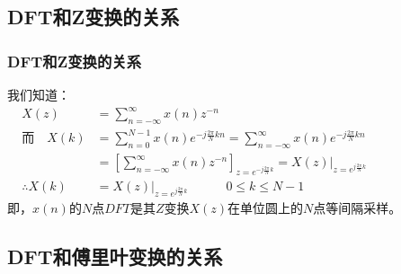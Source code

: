 \documentclass[notheorems,compress,mathserif,table]{beamer}
\begin{document}
\subsection{DFT和Z变换的关系}

\begin{frame}\frametitle{DFT和Z变换的关系}%
我们知道：
\begin{equation*}
\begin{split}
                X(z) &= \sum_{n=-\infty}^{\infty}x(n)z^{-n}\qquad\qquad\qquad\qquad\qquad\qquad\qquad\qquad\qquad \\
\mbox{而}\quad  X(k) &= \sum_{n=0}^{N-1}x(n)e^{-j\frac{2\pi}{N}kn}
                      = \sum_{n=-\infty}^{\infty}x(n)e^{-j\frac{2\pi}{N}kn}\\
                     &= \left[\sum_{n=-\infty}^{\infty}x(n) z^{-n}\right]_{z = e^{-j\frac{2\pi}{N}k}} =X(z)\Big|_{z = e^{j\frac{2\pi}{N}k}}   \\
\therefore  X(k)     &= X(z)\Big|_{z = e^{j\frac{2\pi}{N}k}} \quad\quad\quad 0 \leq k \leq N-1
\end{split}
\end{equation*}
即，$x(n)$的$N$点$DFT$是其$Z$变换$X(z)$在单位圆上的$N$点等间隔采样。
\end{frame}






\subsection{DFT和傅里叶变换的关系}
\end{document}
